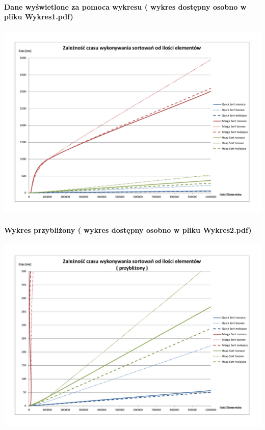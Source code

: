 \documentclass[10 pt]{article}
\begin{document}
\paragraph{Dane wyświetlone za pomoca wykresu ( wykres dostępny osobno w pliku Wykres1.pdf) }
\begin{center}
\includegraphics[scale=0.4]{Wykres1.pdf}
\end{center}

\paragraph{Wykres przybliżony ( wykres dostępny osobno w pliku Wykres2.pdf) }
\begin{center}
\includegraphics[scale=0.4]{Wykres2.pdf}
\end{center}
\end{document}
